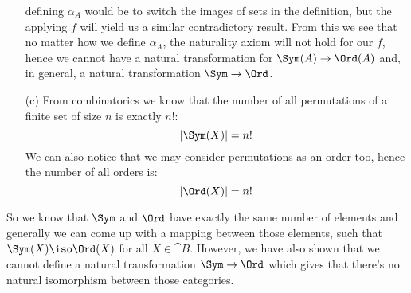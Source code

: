 \begin{answer}
\begin{itemize}
      defining $\alpha_A$ would be to switch the images of sets in the
      definition, but the applying $f$ will yield us a similar contradictory
      result.  From this we see that no matter how we define $\alpha_A$, the
      naturality axiom will not hold for our $f$, hence we cannot have a
      natural transformation for $\Sym(A) \to \Ord(A)$ and, in general, a
      natural transformation $\Sym \to \Ord$.
    \item[(c)]
      From combinatorics we know that the number of all permutations of a
      finite set of size $n$ is exactly $n$!:\\
      \begin{equation*}
        |\Sym(X)| = n!
      \end{equation*}
      We can also notice that we may consider permutations as an order too,
      hence the number of all orders is:
      \begin{equation*}
        |\Ord(X)| = n!
      \end{equation*}
  \end{itemize}
  So we know that $\Sym$ and $\Ord$ have exactly the same number of elements
  and generally we can come up with a mapping between those elements, such that
  $\Sym(X) \iso \Ord(X)$ for all $X \in \cat{B}$. However, we have also shown
  that we cannot define a natural transformation $\Sym \to \Ord$ which gives
  that there's no natural isomorphism between those categories.
\end{answer}


